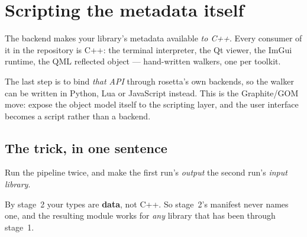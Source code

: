 \chapter{Scripting the metadata itself}
\label{ch:scriptable}

The  backend makes your library's metadata available \emph{to
C++}. Every consumer of it in the repository is C++: the terminal interpreter,
the Qt viewer, the ImGui runtime, the QML reflected object --- hand-written
walkers, one per toolkit.

The last step is to bind \emph{that API} through rosetta's own backends, so the
walker can be written in Python, Lua or JavaScript instead. This is the
Graphite/GOM move: expose the object model itself to the scripting layer, and
the user interface becomes a script rather than a backend.

\section{The trick, in one sentence}

Run the pipeline twice, and make the first run's \emph{output} the second run's
\emph{input library}.

\begin{center}
\end{center}

By stage~2 your types are \textbf{data}, not C++. So stage~2's manifest never
names one, and the resulting module works for \emph{any} library that has been
through stage~1.

